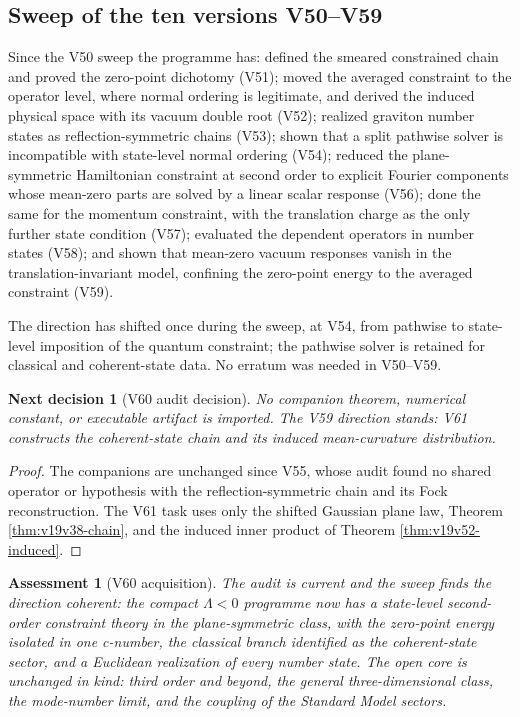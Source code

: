 \documentclass[11pt]{article}
\newtheorem{decision}[theorem]{Next decision}
\newtheorem{assessment}[theorem]{Assessment}
\theoremstyle{remark}
\begin{document}
\subsection{Sweep of the ten versions V50--V59}

Since the V50 sweep the programme has: defined the smeared constrained
chain and proved the zero-point dichotomy (V51); moved the averaged
constraint to the operator level, where normal ordering is legitimate,
and derived the induced physical space with its vacuum double root
(V52); realized graviton number states as reflection-symmetric chains
(V53); shown that a split pathwise solver is incompatible with
state-level normal ordering (V54); reduced the plane-symmetric
Hamiltonian constraint at second order to explicit Fourier components
whose mean-zero parts are solved by a linear scalar response (V56);
done the same for the momentum constraint, with the translation charge
as the only further state condition (V57); evaluated the dependent
operators in number states (V58); and shown that mean-zero vacuum
responses vanish in the translation-invariant model, confining the
zero-point energy to the averaged constraint (V59).

The direction has shifted once during the sweep, at V54, from
pathwise to state-level imposition of the quantum constraint; the
pathwise solver is retained for classical and coherent-state data.
No erratum was needed in V50--V59.

\begin{decision}[V60 audit decision]
\label{dec:v19v60-audit}
No companion theorem, numerical constant, or executable artifact is
imported.  The V59 direction stands: V61 constructs the coherent-state
chain and its induced mean-curvature distribution.
\end{decision}

\begin{proof}
The companions are unchanged since V55, whose audit found no shared
operator or hypothesis with the reflection-symmetric chain and its
Fock reconstruction.  The V61 task uses only the shifted Gaussian plane
law, Theorem \ref{thm:v19v38-chain}, and the induced inner product of
Theorem \ref{thm:v19v52-induced}.
\end{proof}

\begin{assessment}[V60 acquisition]
\label{ass:v19v60}
The audit is current and the sweep finds the direction coherent: the
compact \(\Lambda<0\) programme now has a state-level second-order
constraint theory in the plane-symmetric class, with the zero-point
energy isolated in one c-number, the classical branch identified as
the coherent-state sector, and a Euclidean realization of every number
state.  The open core is unchanged in kind: third order and beyond,
the general three-dimensional class, the mode-number limit, and the
coupling of the Standard Model sectors.
\end{assessment}
\end{document}
